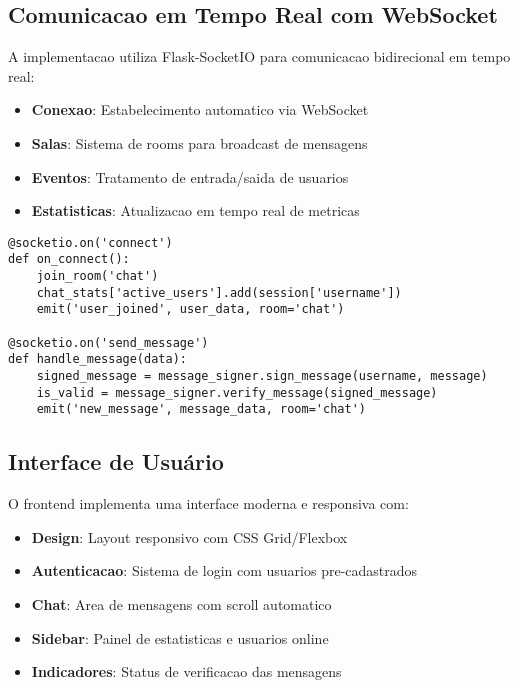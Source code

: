 \documentclass[12pt,a4paper,oneside]{article}
\begin{document}
\subsection{Comunicacao em Tempo Real com WebSocket}

A implementacao utiliza Flask-SocketIO para comunicacao bidirecional em tempo real:

\begin{itemize}
    \item \textbf{Conexao}: Estabelecimento automatico via WebSocket
    \item \textbf{Salas}: Sistema de rooms para broadcast de mensagens
    \item \textbf{Eventos}: Tratamento de entrada/saida de usuarios
    \item \textbf{Estatisticas}: Atualizacao em tempo real de metricas
\end{itemize}

\begin{lstlisting}[caption=Eventos WebSocket principais]
@socketio.on('connect')
def on_connect():
    join_room('chat')
    chat_stats['active_users'].add(session['username'])
    emit('user_joined', user_data, room='chat')

@socketio.on('send_message')
def handle_message(data):
    signed_message = message_signer.sign_message(username, message)
    is_valid = message_signer.verify_message(signed_message)
    emit('new_message', message_data, room='chat')
\end{lstlisting}

\subsection{Interface de Usuário}

O frontend implementa uma interface moderna e responsiva com:

\begin{itemize}
    \item \textbf{Design}: Layout responsivo com CSS Grid/Flexbox
    \item \textbf{Autenticacao}: Sistema de login com usuarios pre-cadastrados
    \item \textbf{Chat}: Area de mensagens com scroll automatico
    \item \textbf{Sidebar}: Painel de estatisticas e usuarios online
    \item \textbf{Indicadores}: Status de verificacao das mensagens
\end{itemize}
\end{document}

